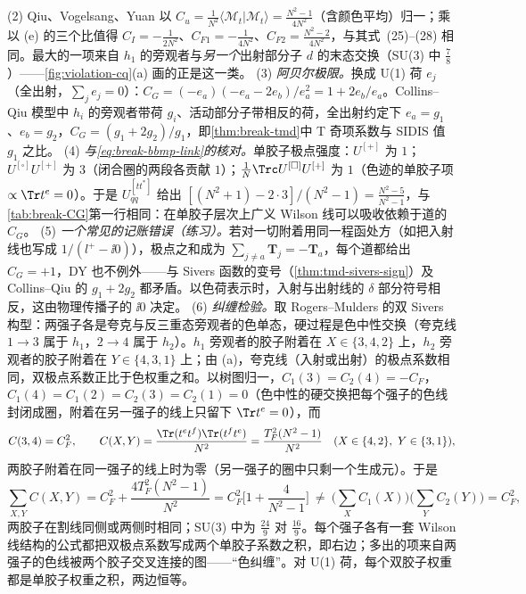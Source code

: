 \begin{example}
(2) Qiu、Vogelsang、Yuan 以 $C_u=\frac1{N^2}\langle\mathcal M_t|\mathcal M_t\rangle=\frac{N^2-1}{4N^2}$（含颜色平均）归一；乘以 (e) 的三个比值得 $C_I=-\frac1{2N^2}$、$C_{F1}=-\frac1{4N^2}$、$C_{F2}=\frac{N^2-2}{4N^2}$，与其式~(25)--(28) 相同。最大的一项来自 $h_1$ 的旁观者与\emph{另一个}出射部分子 $d$ 的末态交换（SU(3) 中 $\frac78$）——\cref{fig:violation-cq}(a) 画的正是这一类。
(3) \emph{阿贝尔极限。}换成 U(1) 荷 $e_j$（全出射，$\sum_je_j=0$）：$C_G=(-e_a)(-e_a-2e_b)/e_a^2=1+2e_b/e_a$。Collins--Qiu 模型中 $h_i$ 的旁观者带荷 $g_i$、活动部分子带相反的荷，全出射约定下 $e_a=g_1$、$e_b=g_2$，$C_G=(g_1+2g_2)/g_1$，即\cref{thm:break-tmd}中 T 奇项系数与 SIDIS 值 $g_1$ 之比。
(4) \emph{与\cref{eq:break-bbmp-link}的核对。}单胶子极点强度：$U^{[+]}$ 为 $1$；$U^{[\square]}U^{[+]}$ 为 $3$（闭合圈的两段各贡献 $1$）；$\frac1N\Trc U^{[\square]}U^{[+]}$ 为 $1$（色迹的单胶子项 $\propto\Tr t^e=0$）。于是 $U^{[tt^*]}_{qq}$ 给出 $[(N^2+1)-2\cdot3]/(N^2-1)=\frac{N^2-5}{N^2-1}$，与\cref{tab:break-CG}第一行相同：在单胶子层次上广义 Wilson 线可以吸收依赖于道的 $C_G$。
(5) \emph{一个常见的记账错误（练习）。}若对一切附着用同一程函处方（如把入射线也写成 $1/(l^+-\ii0)$），极点之和成为 $\sum_{j\neq a}\mathbf T_j=-\mathbf T_a$，每个道都给出 $C_G=+1$，DY 也不例外——与 Sivers 函数的变号（\cref{thm:tmd-sivers-sign}）及 Collins--Qiu 的 $g_1+2g_2$ 都矛盾。以色荷表示时，入射与出射线的 $\delta$ 部分符号相反，这由物理传播子的 $\ii0$ 决定。
(6) \emph{纠缠检验。}取 Rogers--Mulders 的双 Sivers 构型\cite{RogersMulders2010}：两强子各是夸克与反三重态旁观者的色单态，硬过程是色中性交换（夸克线 $1\to3$ 属于 $h_1$，$2\to4$ 属于 $h_2$）。$h_1$ 旁观者的胶子附着在 $X\in\{3,4,2\}$ 上，$h_2$ 旁观者的胶子附着在 $Y\in\{4,3,1\}$ 上；由 (a)，夸克线（入射或出射）的极点系数相同，双极点系数正比于色权重之和。以树图归一，$C_1(3)=C_2(4)=-C_F$，$C_1(4)=C_1(2)=C_2(3)=C_2(1)=0$（色中性的硬交换把每个强子的色线封闭成圈，附着在另一强子的线上只留下 $\Tr t^e=0$），而
\begin{equation}\label{eq:break-entangle-weights}
C(3,4)=C_F^2,\qquad C(X,Y)=\frac{\Tr(t^et^f)\Tr(t^ft^e)}{N^2}=\frac{T_F^2(N^2-1)}{N^2}\quad(X\in\{4,2\},\ Y\in\{3,1\}),
\end{equation}
两胶子附着在同一强子的线上时为零（另一强子的圈中只剩一个生成元）。于是
\begin{equation}\label{eq:break-entangle}
\sum_{X,Y}C(X,Y)=C_F^2+\frac{4T_F^2(N^2-1)}{N^2}=C_F^2\Big[1+\frac{4}{N^2-1}\Big]\ \neq\ \Big(\sum_XC_1(X)\Big)\Big(\sum_YC_2(Y)\Big)=C_F^2 ,
\end{equation}
两胶子在割线同侧或两侧时相同；SU(3) 中为 $\frac{24}9$ 对 $\frac{16}9$。每个强子各有一套 Wilson 线结构的公式都把双极点系数写成两个单胶子系数之积，即右边；多出的项来自两强子的色线被两个胶子交叉连接的图——“色纠缠”。对 U(1) 荷，每个双胶子权重都是单胶子权重之积，两边恒等。
\end{example}

